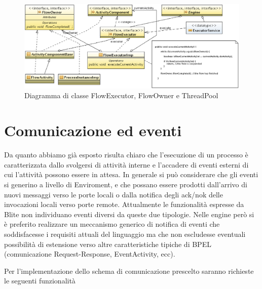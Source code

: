 \begin{figure}[p]
\begin{center}
\includegraphics[angle=90,scale=0.75]
{architettura_interna/dia/flowClassDiagram}
\caption[Diagramma di classe FlowExecutor \ldots] {
   	\textsf{{\small Diagramma di classe FlowExecutor, FlowOwner e ThreadPool}} }
  \label{fig:flowclass}
\end{center}
\end{figure}

\section{Comunicazione ed eventi}
Da quanto abbiamo già esposto risulta chiaro che l'esecuzione di un processo \`e
caratterizzata dallo svolgersi di attività interne e l'accadere di eventi
esterni di cui l'attività possono essere in attesa. In generale si può
considerare che gli eventi si generino a livello di Enviroment, e che possano
essere prodotti dall'arrivo di nuovi messaggi verso le porte locali o
dalla notifica degli ack/nok delle invocazioni locali
verso porte remote. Attualmente le funzionalità espresse da Blite non
individuano eventi diversi da queste due tipologie. Nelle engine però si \`e
preferito realizzare un meccanismo generico di notifica di eventi che
soddisfacesse i requisiti attuali del linguaggio ma che non escludesse eventuali
possibilità di estensione verso altre caratteristiche tipiche di BPEL
(comunicazione Request-Response, EventActivity, ecc).

Per l'implementazione dello schema di comunicazione prescelto saranno richieste
le seguenti funzionalità

